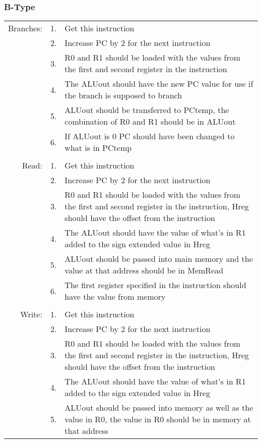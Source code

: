 		\subsubsection{B-Type}
			\begin{longtable}{ r  r  p{13cm} }
				Branches: & 1. & Get this instruction\\
				          & 2. & Increase PC by 2 for the next instruction\\
				          & 3. & R0 and R1 should be loaded with the values from the first and second register in the instruction\\
				          & 4. & The ALUout should have the new PC value for use if the branch is supposed to branch\\
				          & 5. & ALUout should be transferred to PCtemp, the combination of R0 and R1 should be in ALUout\\
				          & 6. & If ALUout is 0 PC should have been changed to what is in PCtemp\\
				          &    & \\
				Read:     & 1. & Get this instruction\\
				          & 2. & Increase PC by 2 for the next instruction\\
				          & 3. & R0 and R1 should be loaded with the values from the first and second register in the instruction, Hreg should have the offset from the instruction\\
				          & 4. & The ALUout should have the value of what's in R1 added to the sign extended value in Hreg\\
				          & 5. & ALUout should be passed into main memory and the value at that address should be in MemRead\\
				          & 6. & The first register specified in the instruction should have the value from memory\\
				          &    & \\
				Write:    & 1. & Get this instruction\\
				          & 2. & Increase PC by 2 for the next instruction\\
				          & 3. & R0 and R1 should be loaded with the values from the first and second register in the instruction, Hreg should have the offset from the instruction\\
				          & 4. & The ALUout should have the value of what's in R1 added to the sign extended value in Hreg\\
				          & 5. & ALUout should be passed into memory as well as the value in R0, the value in R0 should be in memory at that address
			\end{longtable}
